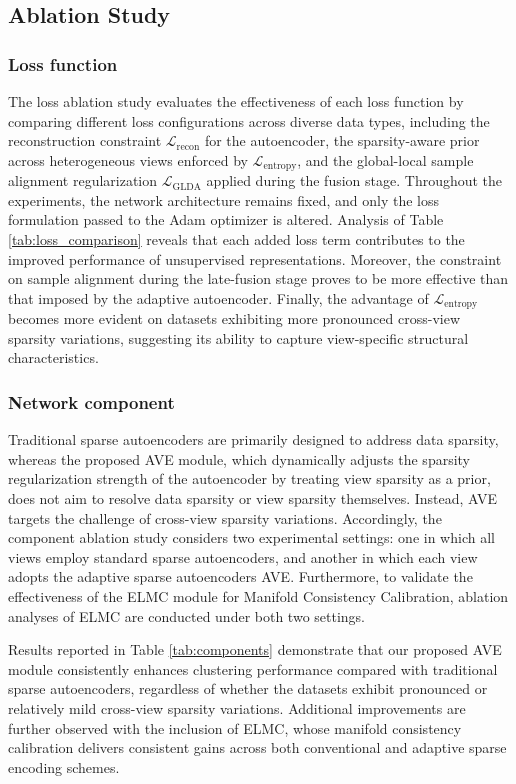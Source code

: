\documentclass[10pt, journal, compsoc]{IEEEtran}
\begin{document}

\subsection{Ablation Study}
\subsubsection{Loss function}
The loss ablation study evaluates the effectiveness of each loss function by comparing different loss configurations across diverse data types, including the reconstruction constraint $\mathcal{L}_{\text{recon}}$ for the autoencoder, the sparsity-aware prior across heterogeneous views enforced by $\mathcal{L}_{\text{entropy}}$, and the global-local sample alignment regularization $\mathcal{L}_{\text{GLDA}}$ applied during the fusion stage. Throughout the experiments, the network architecture remains fixed, and only the loss formulation passed to the Adam optimizer is altered. Analysis of Table \ref{tab:loss_comparison} reveals that each added loss term contributes to the improved performance of unsupervised representations. Moreover, the constraint on sample alignment during the late-fusion stage proves to be more effective than that imposed by the adaptive autoencoder. Finally, the advantage of $\mathcal{L}_{\text{entropy}}$ becomes more evident on datasets exhibiting more pronounced cross-view sparsity variations, suggesting its ability to capture view-specific structural characteristics.

\subsubsection{Network component}
Traditional sparse autoencoders are primarily designed to address data sparsity, whereas the proposed AVE module, which dynamically adjusts the sparsity regularization strength of the autoencoder by treating view sparsity as a prior, does not aim to resolve data sparsity or view sparsity themselves. Instead, AVE targets the challenge of cross-view sparsity variations. Accordingly, the component ablation study considers two experimental settings: one in which all views employ standard sparse autoencoders, and another in which each view adopts the adaptive sparse autoencoders AVE. Furthermore, to validate the effectiveness of the ELMC module for Manifold Consistency Calibration, ablation analyses of ELMC are conducted under both two settings.

Results reported in Table \ref{tab:components} demonstrate that our proposed AVE module consistently enhances clustering performance compared with traditional sparse autoencoders, regardless of whether the datasets exhibit pronounced or relatively mild cross-view sparsity variations. Additional improvements are further observed with the inclusion of ELMC, whose manifold consistency calibration delivers consistent gains across both conventional and adaptive sparse encoding schemes.
\end{document}
